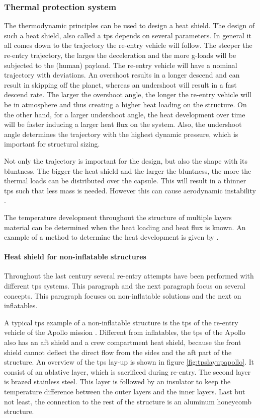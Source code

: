 \subsubsection{Thermal protection system}
The thermodynamic principles can be used to design a heat shield. The design of such a heat shield, also called a \acrfull{tps} depends on several parameters. In general it all comes down to the trajectory the re-entry vehicle will follow. The steeper the re-entry trajectory, the larges the deceleration and the more g-loads will be subjected to the (human) payload. The re-entry vehicle will have a nominal trajectory with deviations. An overshoot results in a longer descend and can result in skipping off the planet, whereas an undershoot will result in a fast descend rate. The larger the overshoot angle, the longer the re-entry vehicle will be in atmosphere and thus creating a higher heat loading on the structure. On the other hand, for a larger undershoot angle, the heat development over time will be faster inducing a larger heat flux on the system. Also, the undershoot angle determines the trajectory with the highest dynamic pressure, which is important for structural sizing. 

Not only the trajectory is important for the design, but also the shape with its bluntness. The bigger the heat shield and the larger the bluntness, the more the  thermal loads can be distributed over the capsule. This will result in a thinner \gls{tps} such that less mass is needed. However this can cause aerodynamic instability \cite{Smoot}.

The temperature development throughout the structure of multiple layers material can be determined when the heat loading and heat flux is known. An example of a method to determine the heat development is given by \cite{Daryabeigi2002}.

\paragraph{Heat shield for non-inflatable structures}
Throughout the last century several re-entry attempts have been performed with different \gls{tps} systems. This paragraph and the next paragraph focus on several concepts. This paragraph focuses on non-inflatable solutions and the next on inflatables. 

A typical \gls{tps} example of a non-inflatable structure is the \gls{tps} of the re-entry vehicle of the Apollo mission \cite{Pavlosky1974}. Different from inflatables, the \gls{tps} of the Apollo also has an aft shield and a crew compartment heat shield, because the front shield cannot deflect the direct flow from the sides and the aft part of the structure. An overview of the \gls{tps} lay-up is shown in figure \ref{fig:tpslayupapollo}. It consist of an ablative layer, which is sacrificed during re-entry. The second layer is brazed stainless steel. This layer is followed by an insulator to keep the temperature difference between the outer layers and the inner layers. Last but not least, the connection to the rest of the structure is an aluminum honeycomb structure.

